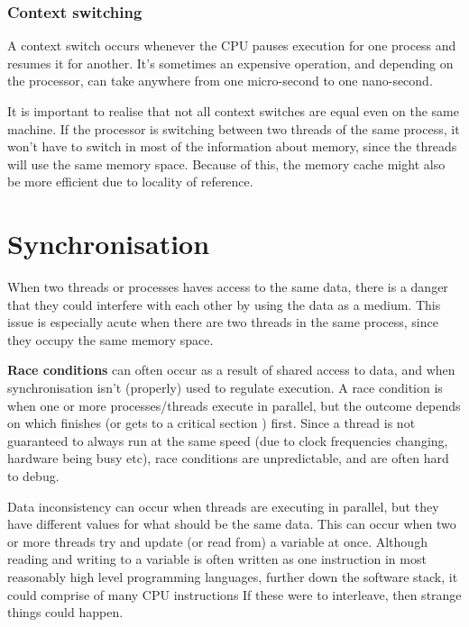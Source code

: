 \subsubsection{Context switching}

A context switch occurs whenever the CPU pauses execution for one process and
resumes it for another. It's sometimes an expensive operation, and depending on
the processor, can take anywhere from one micro-second to one nano-second.


It is important to realise that not all context switches are equal even on the
same machine. If the processor is switching between two threads of the same
process, it won't have to switch in most of the information about memory, since
the threads will use the same memory space. Because of this, the memory cache
might also be more efficient due to locality of reference.

\section{Synchronisation}

When two threads or processes haves access to the same data, there is a danger
that they could interfere with each other by using the data as a medium. This
issue is especially acute when there are two threads in the same process, since
they occupy the same memory space.

\textbf{Race conditions} can often occur as a result of shared access to data,
and when synchronisation isn't (properly) used to regulate execution. A race
condition is when one or more processes/threads execute in parallel, but the
outcome depends on which finishes (or gets to a critical section ) first. Since a thread is not guaranteed to always run at the same speed
(due to clock frequencies changing, hardware being busy etc), race conditions
are unpredictable, and are often hard to debug.

Data inconsistency can occur when threads are executing in parallel, but they
have different values for what should be the same data. This can occur when two
or more threads try and update (or read from) a variable at once. Although
reading and writing to a variable is often written as one instruction in most
reasonably high level programming languages, further down the software stack, it
could comprise of many CPU instructions If these were to interleave, then strange
things could happen.

